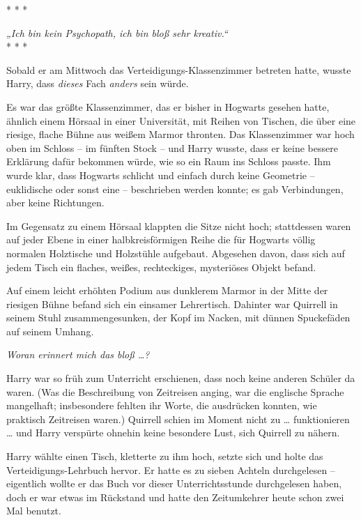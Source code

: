 

\hypertarget{laterales-denken}{%

* * *

\hfill\break \emph{„Ich bin kein Psychopath, ich bin bloß sehr kreativ.“}\\

* * *

Sobald er am Mittwoch das Verteidigungs-Klassenzimmer betreten hatte, wusste Harry, dass \emph{dieses} Fach \emph{anders} sein würde.

Es war das größte Klassenzimmer, das er bisher in Hogwarts gesehen hatte, ähnlich einem Hörsaal in einer Universität, mit Reihen von Tischen, die über eine riesige, flache Bühne aus weißem Marmor thronten. Das Klassenzimmer war hoch oben im Schloss -- im fünften Stock -- und Harry wusste, dass er keine bessere Erklärung dafür bekommen würde, wie so ein Raum ins Schloss passte. Ihm wurde klar, dass Hogwarts schlicht und einfach durch keine Geometrie -- euklidische oder sonst eine -- beschrieben werden konnte; es gab Verbindungen, aber keine Richtungen.

Im Gegensatz zu einem Hörsaal klappten die Sitze nicht hoch; stattdessen waren auf jeder Ebene in einer halbkreisförmigen Reihe die für Hogwarts völlig normalen Holztische und Holzstühle aufgebaut. Abgesehen davon, dass sich auf jedem Tisch ein flaches, weißes, rechteckiges, mysteriöses Objekt befand.

Auf einem leicht erhöhten Podium aus dunklerem Marmor in der Mitte der riesigen Bühne befand sich ein einsamer Lehrertisch. Dahinter war Quirrell in seinem Stuhl zusammengesunken, der Kopf im Nacken, mit dünnen Spuckefäden auf seinem Umhang.

\emph{Woran erinnert mich das bloß …?}

Harry war so früh zum Unterricht erschienen, dass noch keine anderen Schüler da waren. (Was die Beschreibung von Zeitreisen anging, war die englische Sprache mangelhaft; insbesondere fehlten ihr Worte, die ausdrücken konnten, wie praktisch Zeitreisen waren.) Quirrell schien im Moment nicht zu … funktionieren … und Harry verspürte ohnehin keine besondere Lust, sich Quirrell zu nähern.

Harry wählte einen Tisch, kletterte zu ihm hoch, setzte sich und holte das Verteidigungs-Lehrbuch hervor. Er hatte es zu sieben Achteln durchgelesen -- eigentlich wollte er das Buch vor dieser Unterrichtsstunde durchgelesen haben, doch er war etwas im Rückstand und hatte den Zeitumkehrer heute schon zwei Mal benutzt.

}
